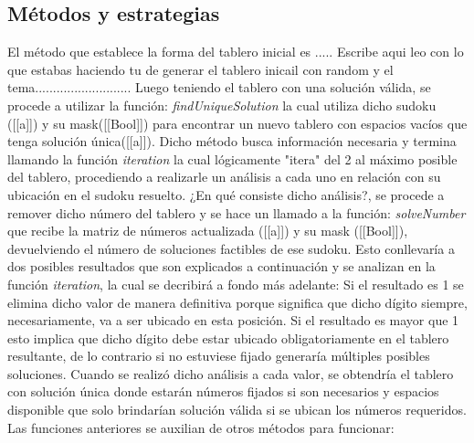 \documentclass[10pt]{amsart}
\begin{document}
	\subsection*{M\'etodos y estrategias}
	El m\'etodo que establece la forma del tablero inicial es ..... Escribe aqui leo con lo que estabas haciendo tu de generar el tablero inicail con random y el tema...........................
	Luego teniendo el tablero con una soluci\'on v\'alida, se procede a utilizar la funci\'on:
	\textit{findUniqueSolution} la cual utiliza dicho sudoku ([[a]]) y su mask([[Bool]]) para encontrar un nuevo tablero con espacios vac\'ios que tenga soluci\'on \'unica([[a]]). Dicho m\'etodo busca informaci\'on necesaria y termina llamando la funci\'on \textit{iteration} la cual l\'ogicamente "itera" del 2 al m\'aximo posible del tablero, procediendo a realizarle un an\'alisis a cada uno en relaci\'on con su ubicaci\'on en el sudoku resuelto. ¿En qu\'e consiste dicho an\'alisis?, se procede a remover dicho n\'umero del tablero y se hace un llamado a la funci\'on:
	 \textit{solveNumber} que recibe la matriz de n\'umeros actualizada ([[a]]) y su mask ([[Bool]]), devuelviendo el n\'umero de soluciones factibles de ese sudoku. Esto conllevar\'ia a dos posibles resultados que son explicados a continuaci\'on y se analizan en la funci\'on \textit{iteration}, la cual se decribir\'a a fondo m\'as adelante:
	 Si el resultado es 1 se elimina dicho valor de manera definitiva porque significa que dicho d\'igito siempre, necesariamente, va a ser ubicado en esta posici\'on.
	 Si el resultado es mayor que 1 esto implica que dicho d\'igito debe estar ubicado obligatoriamente en el tablero resultante, de lo contrario si no estuviese fijado generar\'ia m\'ultiples posibles soluciones.
	 Cuando se realiz\'o dicho an\'alisis a cada valor, se obtendr\'ia el tablero con soluci\'on \'unica donde estar\'an n\'umeros fijados si son necesarios y espacios disponible que solo brindar\'ian soluci\'on v\'alida si se ubican los n\'umeros requeridos.
	 Las funciones anteriores se auxilian de otros m\'etodos para funcionar:
	 
\end{document}
